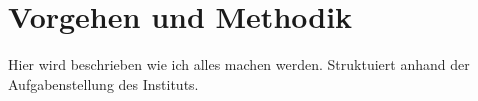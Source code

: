 %
%            
%
%
%

\chapter{Vorgehen und Methodik}
\label{chap:Vorgehen}

Hier wird beschrieben wie ich alles machen werden. Struktuiert anhand der Aufgabenstellung des Instituts.


%


